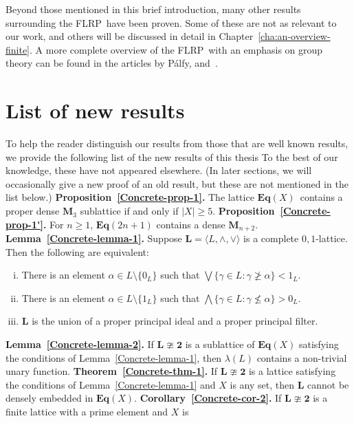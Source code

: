 \documentclass[cm,dissertation,actual,final]{uhthesis}
\theoremstyle{plain}
\theoremstyle{definition}
\theoremstyle{remark}
\numberwithin{theorem}{section}
\numberwithin{claim}{chapter}
\numberwithin{equation}{section}
\numberwithin{conjecture}{chapter}
\newcommand{\Palfy}{P\'alfy}
\newcommand{\<}{\ensuremath{\langle}}
\renewcommand{\>}{\ensuremath{\rangle}}
\renewcommand{\nleq}{\ensuremath{\nleqslant}}
\renewcommand{\geq}{\ensuremath{\geqslant}}
\renewcommand{\ngeq}{\ensuremath{\ngeqslant}}
\newcommand{\meet}{\ensuremath{\wedge}}
\newcommand{\join}{\ensuremath{\vee}}
\newcommand{\bEq}{\ensuremath{\mathbf{Eq}}}
\newcommand{\bEqX}{\ensuremath{\mathbf{Eq}(X)}}
\newcommand{\FLRP}{{\small FLRP}}
\newcommand{\0}{\ensuremath{\mathbf{0}}}
\newcommand{\1}{\ensuremath{\mathbf{1}}}
\newcommand{\2}{\ensuremath{\mathbf{2}}}
\newcommand{\3}{\ensuremath{\mathbf{3}}}
\newcommand{\4}{\ensuremath{\mathbf{4}}}
\newcommand{\5}{\ensuremath{\mathbf{5}}}
\newcommand{\bL}{\ensuremath{\mathbf{L}}}
\newcommand{\bM}{\ensuremath{\mathbf{M}}}
\begin{document}
Beyond those mentioned in this brief introduction, many other results
surrounding the \FLRP\ have been proven.  Some of these are not as relevant to
our work, and others will be discussed in detail in
Chapter~\ref{cha:an-overview-finite}. A more complete overview of
the \FLRP\ with an emphasis on group theory can be found in the articles by
\Palfy, \cite{Palfy:1995} and~\cite{Palfy:2001}.  


\section{List of new results}
\label{sec:overview-new-results}
To help the reader distinguish our results from those that are well known
results, we provide the following list of the new results of this thesis   
To the best of our knowledge, these have not appeared elsewhere.  (In later
sections, we will occasionally give a new proof of an old result, but these are
not mentioned in the list below.)  
\vskip4mm \noindent
{\bf Proposition~\ref{Concrete-prop-1}.}
The lattice \bEqX\ contains a proper dense $\bM_3$ sublattice if and only if $|X|\geq 5$.
\vskip4mm \noindent
{\bf Proposition~\ref{Concrete-prop-1'}.}
  For $n\geq 1$, $\bEq(2n+1)$ contains a dense $\bM_{n+2}$.
\vskip4mm \noindent
{\bf Lemma~\ref{Concrete-lemma-1}.}
Suppose $\bL = \langle L, \meet, \join\rangle$ is a complete $0,1$-lattice. Then the following
are equivalent:
\begin{enumerate}[(i)]
\item There is an element 
$\alpha \in L \setminus \{0_L\}$
such that $\bigvee\{\gamma\in L: \gamma \ngeq \alpha \} < 1_L$.
\item There is an element $\alpha \in L \setminus \{1_L\}$ such that
  $\bigwedge\{\gamma\in L: \gamma \nleq \alpha \} > 0_L$.
\item $\bL$ is the union of a proper principal ideal and a proper principal filter.
\end{enumerate}
\vskip4mm \noindent
{\bf Lemma~\ref{Concrete-lemma-2}.} If $\bL\ncong \mathbf{2}$ is a sublattice of
$\bEqX$ satisfying the conditions of Lemma~\ref{Concrete-lemma-1}, then $\lambda(L)$
contains a non-trivial unary function. 
\vskip4mm \noindent
{\bf Theorem~\ref{Concrete-thm-1}.} 
If $\bL\ncong \mathbf{2}$ is a lattice satisfying the conditions of Lemma~\ref{Concrete-lemma-1}
  and $X$ is any set, then $\bL$ cannot be densely embedded in $\bEqX$.
\vskip4mm \noindent
{\bf Corollary~\ref{Concrete-cor-2}.}
If $\bL\ncong \mathbf{2}$ is a finite lattice with a prime element and $X$ is
\end{document}
